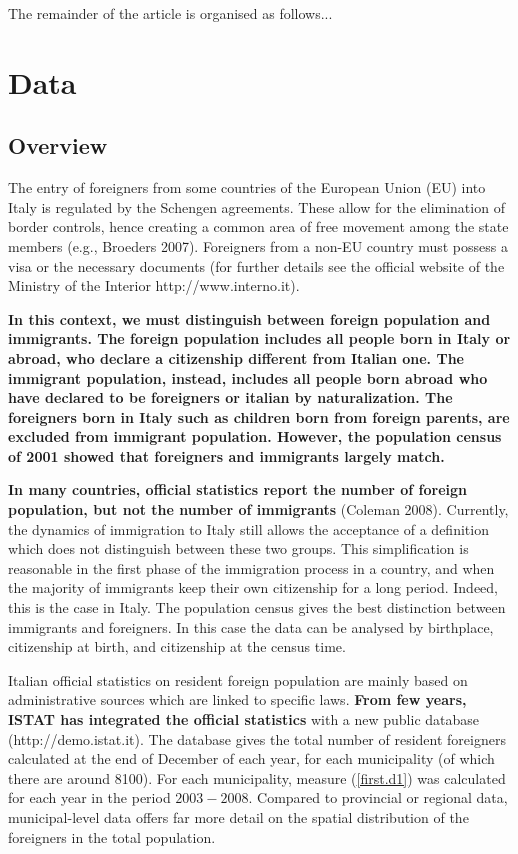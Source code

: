 \documentclass[10pt] {article}
\theoremstyle{definition}
\theoremstyle{plain}
\begin{document}
The remainder of the article is organised as follows...


\section{Data \label{DAT}}

\subsection{Overview \label{SDC}}

The entry of foreigners from some countries of the European Union (EU) into Italy is regulated by the Schengen agreements. These allow for the elimination of border controls, hence creating a common area of free movement among the state members (e.g., Broeders 2007). Foreigners from a non-EU country must possess a visa or the necessary documents (for further details see the official website of the Ministry of the Interior http://www.interno.it). 
 
\textbf{In this context, we must distinguish between foreign population and immigrants. The foreign population includes all people born in Italy or abroad, who declare a citizenship different from Italian one. The immigrant population, instead, includes all people born abroad who have declared to be foreigners or italian by naturalization. The foreigners born in Italy such as children born from foreign parents, are excluded from immigrant population. However, the population census of 2001 showed that foreigners and immigrants largely match. }

\textbf{In many countries, official statistics report the number of foreign population, but not the number of immigrants }(Coleman 2008). Currently, the dynamics of immigration to Italy still allows the acceptance of a definition which does not distinguish between these two groups. This simplification is reasonable in the first phase of the immigration process in a country, and when the majority of immigrants keep their own citizenship for a long period. Indeed, this is the case in Italy. The population census gives the best distinction between immigrants and foreigners. In this case the data can be analysed by birthplace, citizenship at birth, and citizenship at the census time. 
 
Italian official statistics on resident foreign population are mainly based on administrative sources which are linked to specific laws. \textbf{From few years, ISTAT has integrated the official statistics} with a new public database (http://demo.istat.it). The database gives the total number of resident foreigners calculated at the end of December of each year, for each municipality (of which there are around 8100). For each municipality, measure (\ref{first.d1}) was calculated for each year in the period $2003-2008$. Compared to provincial or regional data, municipal-level data offers far more detail on the spatial distribution of the foreigners in the total population.
 
\end{document}
